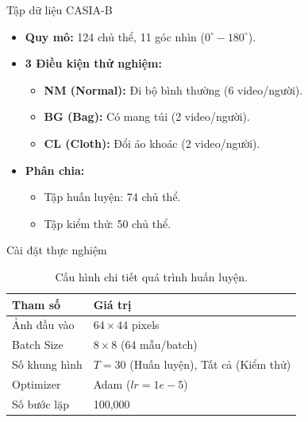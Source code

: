 \begin{frame}{Tập dữ liệu CASIA-B}
    \begin{itemize}
        \item \textbf{Quy mô:} 124 chủ thể, 11 góc nhìn ($0^{\circ}-180^{\circ}$).
        \item \textbf{3 Điều kiện thử nghiệm:}
              \begin{itemize}
                  \item \textbf{NM (Normal):} Đi bộ bình thường (6 video/người).
                  \item \textbf{BG (Bag):} Có mang túi (2 video/người).
                  \item \textbf{CL (Cloth):} Đổi áo khoác (2 video/người).
              \end{itemize}
        \item \textbf{Phân chia:}
              \begin{itemize}
                  \item Tập huấn luyện: 74 chủ thể.
                  \item Tập kiểm thử:  50 chủ thể.
              \end{itemize}
    \end{itemize}
\end{frame}

\begin{frame}{Cài đặt thực nghiệm}
    \begin{table}
        \centering
        \begin{tabular}{ll}
            \toprule
            \textbf{Tham số} & \textbf{Giá trị}                       \\
            \midrule
            Ảnh đầu vào      & $64 \times 44$ pixels                  \\
            Batch Size       & $8 \times 8$ (64 mẫu/batch)            \\
            Số khung hình    & $T=30$ (Huấn luyện), Tất cả (Kiểm thử) \\
            Optimizer        & Adam ($lr=1e-5$)                       \\
            Số bước lặp      & 100,000                                \\
            \bottomrule
        \end{tabular}
        \caption{Cấu hình chi tiết quá trình huấn luyện.}
    \end{table}
\end{frame}

